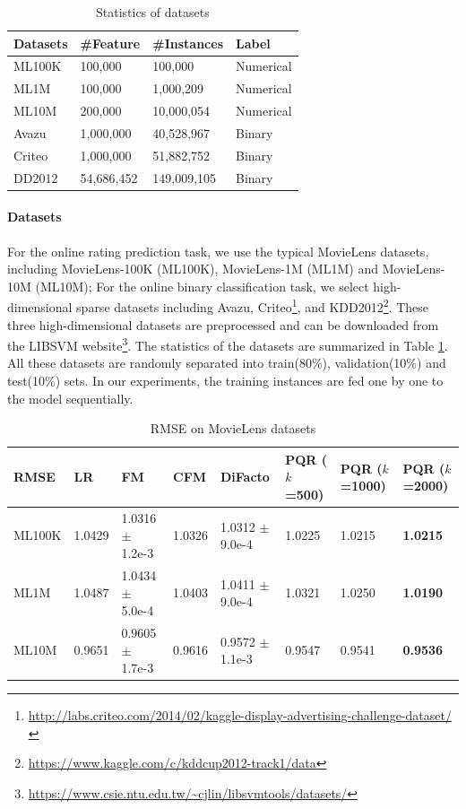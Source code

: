 \documentclass[letterpaper]{article} %
\theoremstyle{plain}
\theoremstyle{definition}
\begin{document}
\begin{table}
\caption{Statistics of datasets}
\label{dataset_stats}
\centering
\begin{tabular}{llll}
\toprule
Datasets     & \#Feature & \#Instances    & Label \\
\midrule
ML100K & 100,000  & 100,000  & Numerical   \\
ML1M & 100,000  & 1,000,209  & Numerical \\
ML10M & 200,000 & 10,000,054 & Numerical \\
\midrule
Avazu & 1,000,000 & 40,528,967 & Binary \\
Criteo & 1,000,000 & 51,882,752 & Binary \\
DD2012 & 54,686,452 & 149,009,105 & Binary \\
\bottomrule
\end{tabular}
\end{table}

\paragraph{Datasets} For the online rating prediction task, we use the typical MovieLens datasets, including MovieLens-100K (ML100K), MovieLens-1M (ML1M) and MovieLens-10M (ML10M); For the online binary classification task, we select high-dimensional sparse datasets including Avazu, Criteo\footnote{\url{http://labs.criteo.com/2014/02/kaggle-display-advertising-challenge-dataset/}}, and KDD2012\footnote{\url{https://www.kaggle.com/c/kddcup2012-track1/data}}. These three high-dimensional datasets are preprocessed and can be downloaded from the LIBSVM website\footnote{\url{https://www.csie.ntu.edu.tw/~cjlin/libsvmtools/datasets/}}. The statistics of the datasets are summarized in Table \ref{dataset_stats}. All these datasets are randomly separated into train(80\%), validation(10\%) and test(10\%) sets. In our experiments, the training instances are fed one by one to the model sequentially.

\begin{table}[]
\caption{RMSE on MovieLens datasets}
\label{rmse_mvl}
\centering
\begin{tabular}{llllllll}
\toprule
RMSE   & LR     & FM                  & CFM    & DiFacto             & PQR ($k$=500) & PQR ($k$=1000) & PQR ($k$=2000)\\
\midrule
ML100K & 1.0429 & 1.0316 $\pm$ 1.2e-3 & 1.0326 & 1.0312 $\pm$ 9.0e-4 & 1.0225    & 1.0215     & \textbf{1.0215} \\
ML1M   & 1.0487 & 1.0434 $\pm$ 5.0e-4 & 1.0403 & 1.0411 $\pm$ 9.0e-4 & 1.0321    & 1.0250     & \textbf{1.0190} \\
ML10M  & 0.9651 & 0.9605 $\pm$ 1.7e-3 & 0.9616 & 0.9572 $\pm$ 1.1e-3 & 0.9547    & 0.9541     & \textbf{0.9536} \\
\bottomrule
\end{tabular}
\end{table}
\end{document}
